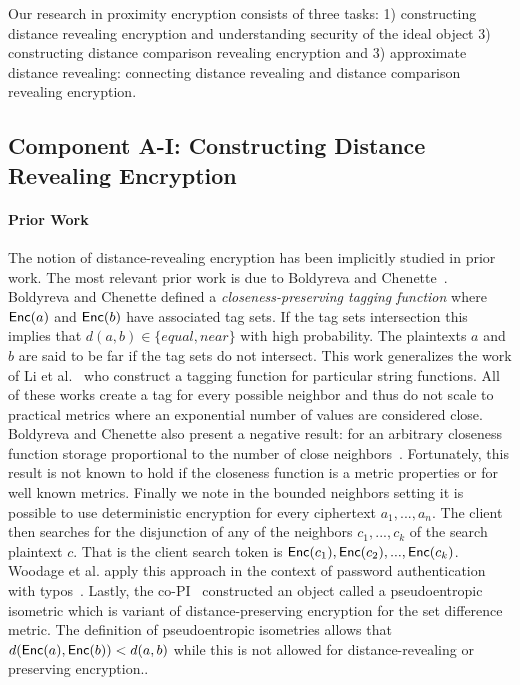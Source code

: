 Our research in proximity encryption consists of three tasks: 1) constructing distance revealing encryption and understanding security of the ideal object 3) constructing distance comparison revealing encryption and 3) approximate distance revealing: connecting distance revealing and distance comparison revealing encryption.

\subsection{Component A-I: Constructing Distance Revealing Encryption}
\paragraph{Prior Work}
The notion of distance-revealing encryption has been implicitly studied in prior work.  The most relevant prior work is due to Boldyreva and Chenette~\cite{boldyreva2014efficient}.  Boldyreva and Chenette defined a \emph{closeness-preserving tagging function} where $\mathsf{Enc}(a)$ and $\mathsf{Enc}(b)$ have associated tag sets.  If the tag sets intersection this implies that $d(a,b) \in\{equal, near\}$ with high probability.  The plaintexts $a$ and $b$ are said to be far if the tag sets do not intersect.  This work generalizes the work of Li et al.~\cite{li2010fuzzy,wang2013efficient} who construct a tagging function for particular string functions.  All of these works create a tag for every possible neighbor and thus do not scale to practical metrics where an exponential number of values are considered close. Boldyreva and Chenette also present a negative result: for an arbitrary closeness function storage proportional to the number of close neighbors~\cite[Theorem 5.2]{boldyreva2014efficient}.  Fortunately, this result is not known to hold if the closeness function is a metric properties or for well known metrics.  Finally we note in the bounded neighbors setting it is possible to use deterministic encryption for every ciphertext $a_1,..., a_n$.  The client then searches for the disjunction of any of the neighbors $c_1,..., c_k$ of the search plaintext $c$.  That is the client search token is $\mathsf{Enc}(c_1), \mathsf{Enc}(c_2),..., \mathsf{Enc}(c_k)$.  Woodage et al. apply this approach in the context of password authentication with typos~\cite{C:WCDJR17}.  Lastly, the co-PI~\cite{EPRINT:ABCFG16} constructed an object called a pseudoentropic isometric which is variant of distance-preserving encryption for the set difference metric.  The definition of pseudoentropic isometries allows that $d(\mathsf{Enc}(a), \mathsf{Enc}(b)) <d(a,b)$ while this is not allowed for distance-revealing or preserving encryption..

